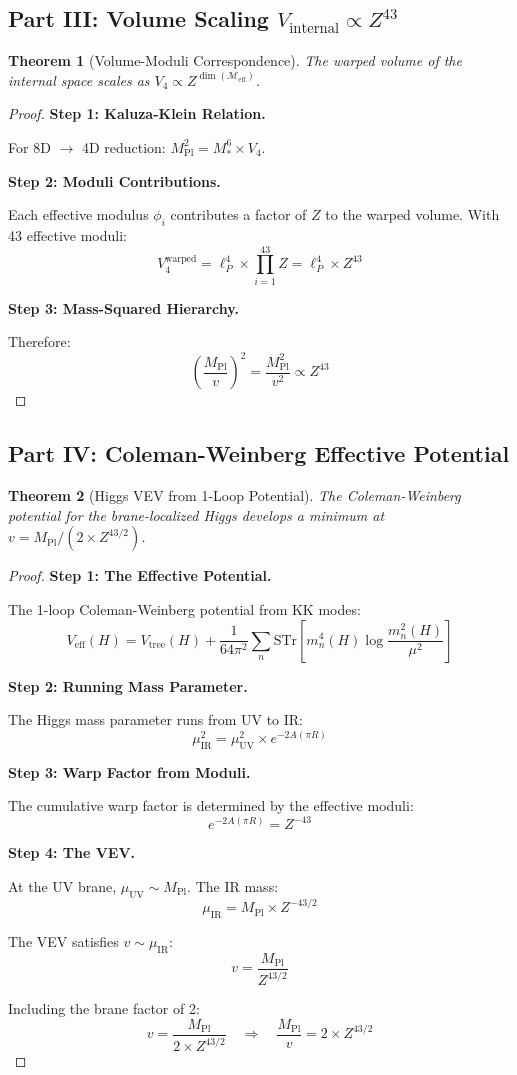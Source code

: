 \documentclass[11pt,a4paper]{article}
\theoremstyle{plain}
\newtheorem{theorem}{Theorem}[section]
\theoremstyle{definition}
\theoremstyle{remark}
\newcommand{\Mpl}{M_{\text{Pl}}}
\begin{document}
\subsection{Part III: Volume Scaling $V_{\text{internal}} \propto Z^{43}$}

\begin{theorem}[Volume-Moduli Correspondence]
The warped volume of the internal space scales as $V_4 \propto Z^{\dim(\mathcal{M}_{\text{eff}})}$.
\end{theorem}

\begin{proof}
\textbf{Step 1: Kaluza-Klein Relation.}

For 8D $\to$ 4D reduction: $\Mpl^2 = M_*^6 \times V_4$.

\textbf{Step 2: Moduli Contributions.}

Each effective modulus $\phi_i$ contributes a factor of $Z$ to the warped volume. With 43 effective moduli:
\[
V_4^{\text{warped}} = \ell_P^4 \times \prod_{i=1}^{43} Z = \ell_P^4 \times Z^{43}
\]

\textbf{Step 3: Mass-Squared Hierarchy.}

Therefore:
\[
\left(\frac{\Mpl}{v}\right)^2 = \frac{\Mpl^2}{v^2} \propto Z^{43}
\]
\end{proof}

\subsection{Part IV: Coleman-Weinberg Effective Potential}

\begin{theorem}[Higgs VEV from 1-Loop Potential]
The Coleman-Weinberg potential for the brane-localized Higgs develops a minimum at $v = \Mpl/(2 \times Z^{43/2})$.
\end{theorem}

\begin{proof}
\textbf{Step 1: The Effective Potential.}

The 1-loop Coleman-Weinberg potential from KK modes:
\[
V_{\text{eff}}(H) = V_{\text{tree}}(H) + \frac{1}{64\pi^2} \sum_n \text{STr}\left[m_n^4(H) \log\frac{m_n^2(H)}{\mu^2}\right]
\]

\textbf{Step 2: Running Mass Parameter.}

The Higgs mass parameter runs from UV to IR:
\[
\mu^2_{\text{IR}} = \mu^2_{\text{UV}} \times e^{-2A(\pi R)}
\]

\textbf{Step 3: Warp Factor from Moduli.}

The cumulative warp factor is determined by the effective moduli:
\[
e^{-2A(\pi R)} = Z^{-43}
\]

\textbf{Step 4: The VEV.}

At the UV brane, $\mu_{\text{UV}} \sim \Mpl$. The IR mass:
\[
\mu_{\text{IR}} = \Mpl \times Z^{-43/2}
\]

The VEV satisfies $v \sim \mu_{\text{IR}}$:
\[
v = \frac{\Mpl}{Z^{43/2}}
\]

Including the brane factor of 2:
\[
v = \frac{\Mpl}{2 \times Z^{43/2}} \quad \Rightarrow \quad \boxed{\frac{\Mpl}{v} = 2 \times Z^{43/2}}
\]
\end{proof}
\end{document}
